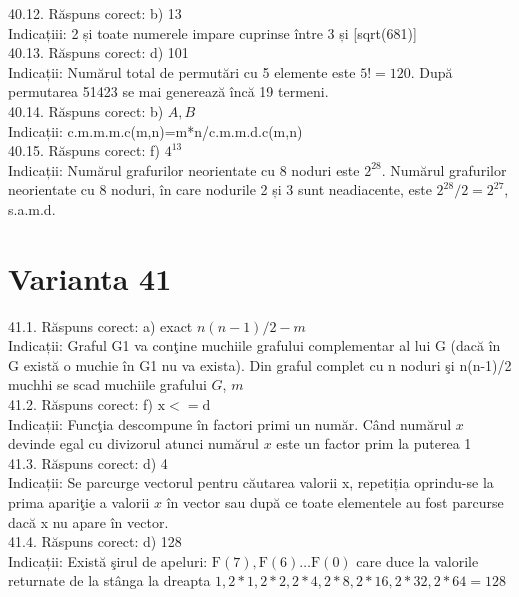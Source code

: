40.12. Răspuns corect: b) 13\\
Indicațiii: 2 și toate numerele impare cuprinse între 3 și [sqrt(681)]\\

40.13. Răspuns corect: d) 101\\
Indicații: Numărul total de permutări cu 5 elemente este $5!=120$. După permutarea 51423 se mai generează încă 19 termeni.\\

40.14. Răspuns corect: b) $A, B$\\
Indicații: c.m.m.m.c(m,n)=m*n/c.m.m.d.c(m,n)\\

40.15. Răspuns corect: f) $4^{13}$\\
Indicații: Numărul grafurilor neorientate cu 8 noduri este $2^{28}$. Numărul grafurilor neorientate cu 8 noduri, în care nodurile 2 și 3 sunt neadiacente, este $2^{28} / 2=2^{27}$, s.a.m.d.\\

\section*{Varianta 41}

41.1. Răspuns corect: a) exact $n(n-1) / 2-m$\\
Indicații: Graful G1 va conţine muchiile grafului complementar al lui G (dacă în G există o muchie în G1 nu va exista). Din graful complet cu n noduri şi n(n-1)/2 muchhi se scad muchiile grafului $G$, $m$\\

41.2. Răspuns corect: f) $\mathrm{x}<=\mathrm{d}$\\
Indicații: Funcţia descompune în factori primi un număr. Când numărul $x$ devinde egal cu divizorul atunci numărul $x$ este un factor prim la puterea 1\\

41.3. Răspuns corect: d) 4\\
Indicații: Se parcurge vectorul pentru căutarea valorii x, repetiția oprindu-se la prima apariţie a valorii $x$ în vector sau după ce toate elementele au fost parcurse dacă x nu apare în vector.\\

41.4. Răspuns corect: d) 128\\
Indicații: Există şirul de apeluri: $\mathrm{F}(7), \mathrm{F}(6) \ldots \mathrm{F}(0)$ care duce la valorile returnate de la stânga la dreapta $1,2 * 1,2 * 2,2 * 4,2 * 8,2 * 16,2 * 32,2 * 64=128$\\

